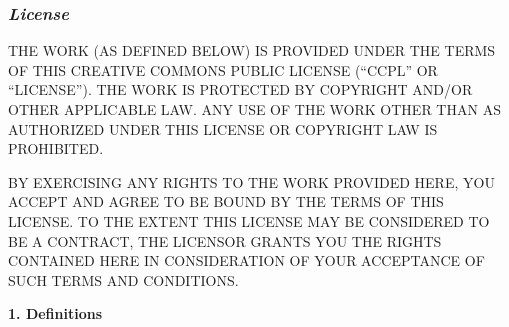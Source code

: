 \subsubsection{\emph{License}}
\par THE WORK (AS DEFINED BELOW) IS PROVIDED UNDER THE TERMS
OF THIS CREATIVE COMMONS PUBLIC LICENSE (``CCPL'' OR
``LICENSE''). THE WORK IS PROTECTED BY COPYRIGHT AND/OR OTHER
APPLICABLE LAW. ANY USE OF THE WORK OTHER THAN AS
AUTHORIZED UNDER THIS LICENSE OR COPYRIGHT LAW IS
PROHIBITED.
\par BY EXERCISING ANY RIGHTS TO THE WORK PROVIDED HERE, YOU
ACCEPT AND AGREE TO BE BOUND BY THE TERMS OF THIS LICENSE.
TO THE EXTENT THIS LICENSE MAY BE CONSIDERED TO BE A
CONTRACT, THE LICENSOR GRANTS YOU THE RIGHTS CONTAINED HERE
IN CONSIDERATION OF YOUR ACCEPTANCE OF SUCH TERMS AND
CONDITIONS.
\par \textbf{1. Definitions}

